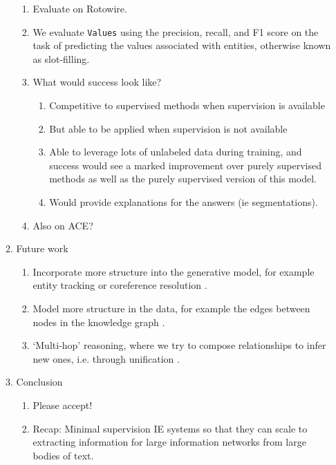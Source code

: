 \documentclass[12pt]{article}
\begin{document}
\begin{enumerate}
\begin{enumerate}
        \begin{enumerate}
        \item Evaluate on Rotowire.
        \item We evaluate \texttt{Values} using the precision, recall, and F1 score on the task
            of predicting the values associated with entities, otherwise known as slot-filling.
        \item What would success look like?
            \begin{enumerate}
            \item Competitive to supervised methods when supervision is available
            \item But able to be applied when supervision is not available
            \item Able to leverage lots of unlabeled data during training,
                and success would see a marked improvement over purely supervised methods
                as well as the purely supervised version of this model.
            \item Would provide explanations for the answers (ie segmentations).
            \end{enumerate}
        \item Also on ACE?
        \end{enumerate}
    \item Future work
        \begin{enumerate}
        \item Incorporate more structure into the generative model,
            for example entity tracking or coreference resolution \citet{haghighi2010coref}.
        \item Model more structure in the data, for example the edges between nodes
            in the knowledge graph \citet{chen2018diva}.
        \item `Multi-hop' reasoning, where we try to compose relationships to infer new ones,
            i.e. through unification \citet{chen2018diva,rock17prove}.
        \end{enumerate}
    \item Conclusion
        \begin{enumerate}
        \item Please accept!
        \item Recap: Minimal supervision IE systems so that they can scale to
            extracting information for large information networks from large bodies of text.
        \end{enumerate}
    \end{enumerate}
\end{enumerate}

\newpage


\end{document}
